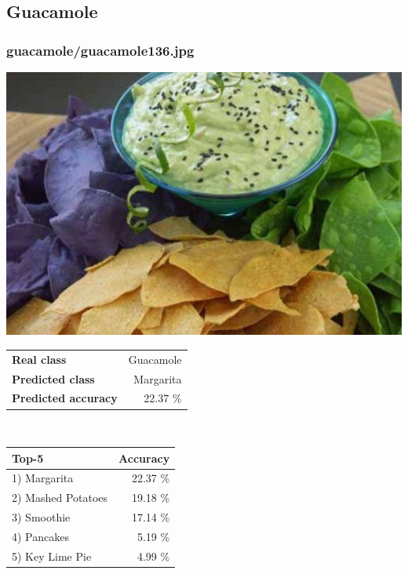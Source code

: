 \subsection{Guacamole}
    
\subsubsection{guacamole/guacamole136.jpg}

\begin{minipage}[t]{0.4\textwidth}
	\vspace{0pt}
	\includegraphics[width=\linewidth]{images/evaluation-images/guacamole/guacamole136.jpg}
\end{minipage}
\hfill
\begin{minipage}[t]{0.5\textwidth}
	\vspace{0pt}\raggedright
	\begin{tabularx}{\textwidth}{X r}
		\small \textbf{Real class} & \small Guacamole\\
		\small \textbf{Predicted class} & \small Margarita\\
		\small \textbf{Predicted accuracy} & \small 22.37 \%
    \end{tabularx}\\
    
    \vspace{6pt}
	\begin{tabularx}{\textwidth}{X r}
        \small \textbf{Top-5} & \small \textbf{Accuracy} \\
        \hline
		\small 1) Margarita & \small 22.37 \%\\\small 2) Mashed Potatoes & \small 19.18 \%\\\small 3) Smoothie & \small 17.14 \%\\\small 4) Pancakes & \small 5.19 \%\\\small 5) Key Lime Pie & \small 4.99 \%
    \end{tabularx}
\end{minipage}
    
